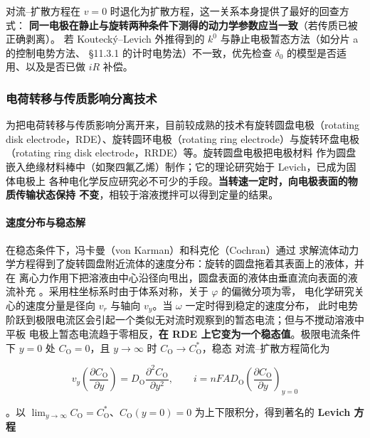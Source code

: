 \begin{crosscheck}
对流–扩散方程在 $v=0$ 时退化为扩散方程，这一关系本身提供了最好的回查方式：
\textbf{同一电极在静止与旋转两种条件下测得的动力学参数应当一致}（若传质已被正确剥离）。
若 Koutecký--Levich 外推得到的 $k^{0}$ 与静止电极暂态方法（如分片 a 的控制电势方法、
\S 11.3.1 的计时电势法）不一致，优先检查 $\delta_0$ 的模型是否适用、以及是否已做 $iR$
补偿。
\end{crosscheck}

\subsubsection{电荷转移与传质影响分离技术}

为把电荷转移与传质影响分离开来，目前较成熟的技术有旋转圆盘电极（rotating disk
electrode，RDE）、旋转圆环电极（rotating ring electrode）与旋转环盘电极（rotating ring
disk electrode，RRDE）等。旋转圆盘电极把电极材料
作为圆盘嵌入绝缘材料棒中（如聚四氟乙烯）制作；它的理论研究始于 Levich，已成为固体电极上
各种电化学反应研究必不可少的手段。\textbf{当转速一定时，向电极表面的物质传输状态保持
不变}，相较于溶液搅拌可以得到定量的结果。

\paragraph{速度分布与稳态解} 在稳态条件下，冯卡曼（von Karman）和科克伦（Cochran）通过
求解流体动力学方程得到了旋转圆盘附近流体的速度分布：旋转的圆盘拖着其表面上的液体，并在
离心力作用下把溶液由中心沿径向甩出，圆盘表面的液体由垂直流向表面的液流补充
。采用柱坐标系时由于体系对称，关于 $\varphi$ 的偏微分项为零，
电化学研究关心的速度分量是径向 $v_r$ 与轴向 $v_y$。当 $\omega$ 一定时得到稳定的速度分布，
此时电势阶跃到极限电流区会引起一个类似无对流时观察到的暂态电流；但与不搅动溶液中平板
电极上暂态电流趋于零相反，\textbf{在 RDE 上它变为一个稳态值}。极限电流条件下 $y=0$ 处
$C_{\mathrm{O}}=0$，且 $y\to\infty$ 时 $C_{\mathrm{O}}\to C_{\mathrm{O}}^{*}$，稳态
对流–扩散方程简化为

\begin{equation}
v_y\left(\frac{\partial C_{\mathrm{O}}}{\partial y}\right)
=D_{\mathrm{O}}\frac{\partial^{2}C_{\mathrm{O}}}{\partial y^{2}},
\qquad
i=nFAD_{\mathrm{O}}\left(\frac{\partial C_{\mathrm{O}}}{\partial y}\right)_{y=0}
\label{eq:rde-steady}
\end{equation}

。以 $\lim_{y\to\infty}C_{\mathrm{O}}
=C_{\mathrm{O}}^{*}$、$C_{\mathrm{O}}(y=0)=0$ 为上下限积分，得到著名的
\textbf{Levich 方程}

